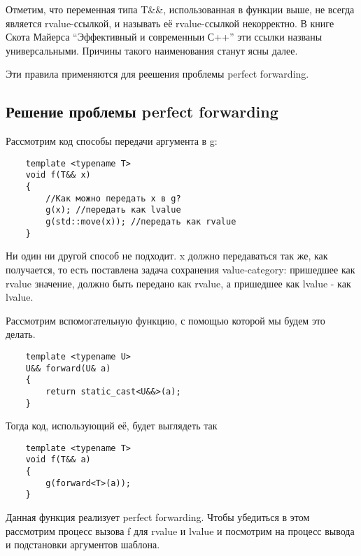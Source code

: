 	\vspace{\baselineskip}

	Отметим, что переменная типа T\&\&, использованная в функции выше, не всегда является rvalue-ссылкой, и называть её rvalue-ссылкой некорректно. В книге Скота Майерса “Эффективный и современныи С++” эти ссылки названы универсальными. Причины такого наименования станут ясны далее.

	Эти правила применяются для реешения проблемы perfect forwarding.

\subsection{Решение проблемы perfect forwarding}

	Рассмотрим код способы передачи аргумента в g:

	\begin{verbatim}
	template <typename T>
	void f(T&& x)
	{
	    //Как можно передать x в g?
	    g(x); //передать как lvalue
	    g(std::move(x)); //передать как rvalue
	}

	\end{verbatim}

	Ни один ни другой способ не подходит. x должно передаваться так же, как получается, то есть поставлена задача сохранения value-category: пришедшее как rvalue значение, должно быть передано как rvalue, а пришедшее как lvalue - как lvalue.

	Рассмотрим вспомогательную функцию, с помощью которой мы будем это делать.

	\begin{verbatim}
	template <typename U>
	U&& forward(U& a)
	{
	    return static_cast<U&&>(a);
	}
	\end{verbatim}

	Тогда код, использующий её, будет выглядеть так

	\begin{verbatim}
	template <typename T>
	void f(T&& a)
	{
	    g(forward<T>(a));
	}
	\end{verbatim}

	Данная функция реализует perfect forwarding. Чтобы убедиться в этом рассмотрим процесс вызова f для rvalue и lvalue и посмотрим на процесс вывода и подстановки аргументов шаблона.

